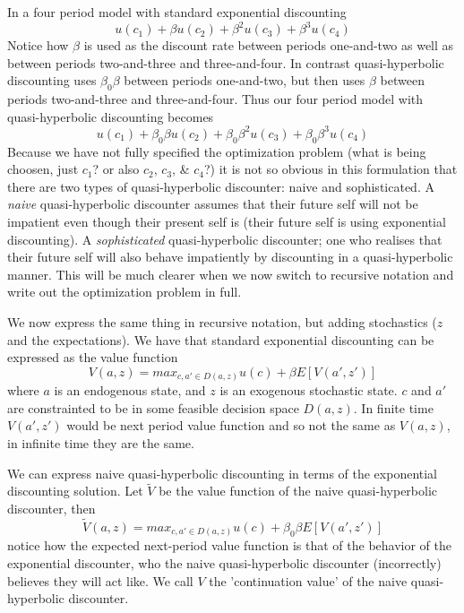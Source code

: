 In a four period model with standard exponential discounting
\begin{equation}
 u(c_1)+\beta u(c_2) +\beta^2 u(c_3)+\beta^3 u(c_4) \label{eqn:expdiscount}
\end{equation}
Notice how $\beta$ is used as the discount rate between periods one-and-two as well as between periods two-and-three and three-and-four. In contrast quasi-hyperbolic discounting uses $\beta_0 \beta$ between periods one-and-two, but then uses $\beta$ between periods two-and-three and three-and-four. Thus our four period model with quasi-hyperbolic discounting becomes
\begin{equation}
 u(c_1)+\beta_0 \beta u(c_2) +\beta_0  \beta^2 u(c_3)+ \beta_0 \beta^3 u(c_4) \label{eqn:qhdiscount}
\end{equation}
Because we have not fully specified the optimization problem (what is being choosen, just $c_1$? or also $c_2$, $c_3$, \& $c_4$?) it is not so obvious in this formulation that there are two types of quasi-hyperbolic discounter: naive and sophisticated. A \textit{naive} quasi-hyperbolic discounter assumes that their future self will not be impatient even though their present self is (their future self is using exponential discounting). A \textit{sophisticated} quasi-hyperbolic discounter; one who realises that their future self will also behave impatiently by discounting in a quasi-hyperbolic manner. This will be much clearer when we now switch to recursive notation and write out the optimization problem in full.

We now express the same thing in recursive notation, but adding stochastics ($z$ and the expectations). We have that standard exponential discounting can be expressed as the value function
\begin{equation} \label{eqn:naive1}
    V(a,z)=max_{c,a' \in D(a,z)} u(c)+\beta E[V(a',z')]
\end{equation}
where $a$ is an endogenous state, and $z$ is an exogenous stochastic state. $c$ and $a'$ are constrainted to be in some feasible decision space $D(a,z)$. In finite time $V(a',z')$ would be next period value function and so not the same as $V(a,z)$, in infinite time they are the same.

We can express naive quasi-hyperbolic discounting in terms of the exponential discounting solution. Let $\tilde{V}$ be the value function of the naive quasi-hyperbolic discounter, then
\begin{equation} \label{eqn:naive2}
    \tilde{V}(a,z)=max_{c,a' \in D(a,z)} u(c)+\beta_0 \beta E[V(a',z')]
\end{equation}
notice how the expected next-period value function is that of the behavior of the exponential discounter, who the naive quasi-hyperbolic discounter (incorrectly) believes they will act like. We call $V$ the 'continuation value' of the naive quasi-hyperbolic discounter.

